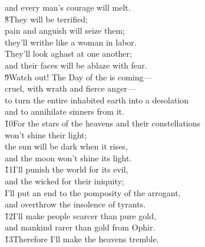 \begin{poetry}
\poemll    and every man's courage will melt. \\
\poeml \v{8}They will be terrified; \\
\poemll    pain and anguish will seize them; \\
\poeml they'll writhe like a woman in labor. \\
\poemll    They'll look aghast at one another; \\
\poemlll       and their faces will be ablaze with fear. \\
\poeml \v{9}Watch out! The Day of the  is coming--- \\
\poemll    cruel, with wrath and fierce anger--- \\
\poeml to turn the entire inhabited earth into a desolation \\
\poemll    and to annihilate sinners from it. \\
\poeml \v{10}For the stars of the heavens and their constellations \\
\poemll    won't shine their light; \\
\poeml the sun will be dark when it rises, \\
\poemll    and the moon won't shine its light. \\
\poeml \v{11}I'll punish the world for its evil, \\
\poemll    and the wicked for their iniquity; \\
\poeml I'll put an end to the pomposity of the arrogant, \\
\poemll    and overthrow the insolence of tyrants. \\
\poeml \v{12}I'll make people scarcer than pure gold, \\
\poemll    and mankind rarer than gold from Ophir. \\
\poeml \v{13}Therefore I'll make the heavens tremble. \\

\end{poetry}
